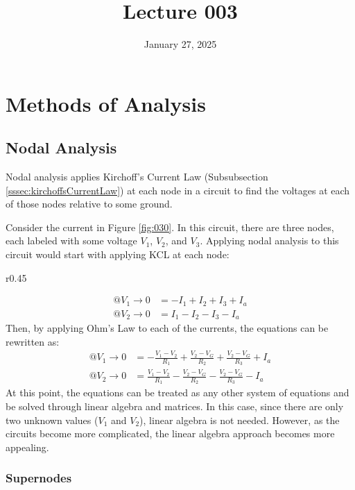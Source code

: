 \documentclass[12pt]{article}
\title{Lecture 003}
\date{January 27, 2025}
\begin{document}
\newpage

\section{Methods of Analysis}
\label{sec:methodsOfAnalysis}

\subsection{Nodal Analysis}
\label{ssec:nodalAnalysis}

Nodal analysis applies Kirchoff's Current Law (Subsubsection \ref{sssec:kirchoffsCurrentLaw}) at each node in a circuit to find the voltages at each of those nodes relative to some ground.

Consider the current in Figure \ref{fig:030}. In this circuit, there are three nodes, each labeled with some voltage $V_1$, $V_2$, and $V_3$. Applying nodal analysis to this circuit would start with applying KCL at each node:
\begin{wrapfigure}[10]{r}{0.45\textwidth}
  \vspace{-10pt}
  \centering
  
  \caption{Nodal Analysis}
  \label{fig:030}
\end{wrapfigure}
\begin{align*}
  @ V_1 \rightarrow 0 &= -I_1 + I_2 + I_3 + I_a \\
  @ V_2 \rightarrow 0 &= I_1 - I_2 - I_3 - I_a
\end{align*}
Then, by applying Ohm's Law to each of the currents, the equations can be rewritten as:
\begin{align*}
  @ V_1 \rightarrow 0 &= -\frac{V_1-V_2}{R_1} + \frac{V_2-V_G}{R_2} + \frac{V_2-V_G}{R_3} + I_a \\
  @ V_2 \rightarrow 0 &= \frac{V_1-V_2}{R_1} - \frac{V_2-V_G}{R_2} - \frac{V_2-V_G}{R_3} - I_a
\end{align*}
At this point, the equations can be treated as any other system of equations and be solved through linear algebra and matrices. In this case, since there are only two unknown values ($V_1$ and $V_2$), linear algebra is not needed. However, as the circuits become more complicated, the linear algebra approach becomes more appealing.

\subsubsection{Supernodes}
\label{sssec:supernodes}
\end{document}
